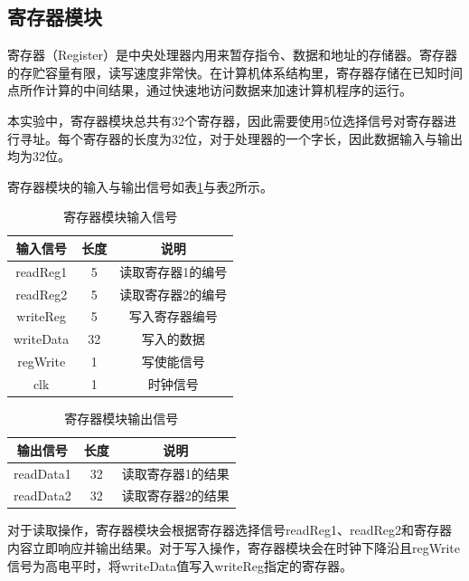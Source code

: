\documentclass[UTF8]{ctexart}
\begin{document}
\subsection{寄存器模块}
寄存器（Register）是中央处理器内用来暂存指令、数据和地址的存储器。寄存器的存贮容量有限，读写速度非常快。在计算机体系结构里，寄存器存储在已知时间点所作计算的中间结果，通过快速地访问数据来加速计算机程序的运行。\par
本实验中，寄存器模块总共有32个寄存器，因此需要使用5位选择信号对寄存器进行寻址。每个寄存器的长度为32位，对于处理器的一个字长，因此数据输入与输出均为32位。
\par
寄存器模块的输入与输出信号如表\ref{tab:reg-input-sig}与表\ref{tab:reg-output-sig}所示。
\begin{table}[htbp]
    \centering
    \begin{tabular}{|c|c|c|}
    \hline
    输入信号 & 长度 & 说明 \\
    \hline
    readReg1 & 5 & 读取寄存器1的编号 \\
    readReg2 & 5 & 读取寄存器2的编号 \\
    writeReg & 5 & 写入寄存器编号 \\
    writeData & 32 & 写入的数据 \\
    regWrite & 1 & 写使能信号 \\
    clk & 1 & 时钟信号\\
    \hline
    \end{tabular}
    \caption{寄存器模块输入信号}
    \label{tab:reg-input-sig}
    \end{table}
    \begin{table}[htbp]
        \centering
        \begin{tabular}{|c|c|c|}
        \hline
        输出信号 & 长度 & 说明 \\ \hline
        readData1 & 32 & 读取寄存器1的结果 \\
        readData2 & 32 & 读取寄存器2的结果 \\ \hline
        \end{tabular}
        \caption{寄存器模块输出信号}
        \label{tab:reg-output-sig}
    \end{table}\par
对于读取操作，寄存器模块会根据寄存器选择信号readReg1、readReg2和寄存器内容立即响应并输出结果。对于写入操作，寄存器模块会在时钟下降沿且regWrite信号为高电平时，将writeData值写入writeReg指定的寄存器。
\end{document}
